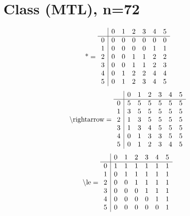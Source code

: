 \documentclass[11pt]{article}
\begin{document}
\section{Class (MTL), n=72}
\[\text{*} = 
\begin{array}{r | r r r r r r}
 & 0 & 1 & 2 & 3 & 4 & 5 \\ \hline
0 & 0 & 0 & 0 & 0 & 0 & 0 \\
1 & 0 & 0 & 0 & 0 & 1 & 1 \\
2 & 0 & 0 & 1 & 1 & 2 & 2 \\
3 & 0 & 0 & 1 & 1 & 2 & 3 \\
4 & 0 & 1 & 2 & 2 & 4 & 4 \\
5 & 0 & 1 & 2 & 3 & 4 & 5 \\
\end{array}
\]
\[\text{\textbackslash rightarrow} = 
\begin{array}{r | r r r r r r}
 & 0 & 1 & 2 & 3 & 4 & 5 \\ \hline
0 & 5 & 5 & 5 & 5 & 5 & 5 \\
1 & 3 & 5 & 5 & 5 & 5 & 5 \\
2 & 1 & 3 & 5 & 5 & 5 & 5 \\
3 & 1 & 3 & 4 & 5 & 5 & 5 \\
4 & 0 & 1 & 3 & 3 & 5 & 5 \\
5 & 0 & 1 & 2 & 3 & 4 & 5 \\
\end{array}
\]
\[\text{\textbackslash le} = 
\begin{array}{r | r r r r r r}
 & 0 & 1 & 2 & 3 & 4 & 5 \\ \hline
0 & 1 & 1 & 1 & 1 & 1 & 1 \\
1 & 0 & 1 & 1 & 1 & 1 & 1 \\
2 & 0 & 0 & 1 & 1 & 1 & 1 \\
3 & 0 & 0 & 0 & 1 & 1 & 1 \\
4 & 0 & 0 & 0 & 0 & 1 & 1 \\
5 & 0 & 0 & 0 & 0 & 0 & 1 \\
\end{array}
\]
\end{document}
